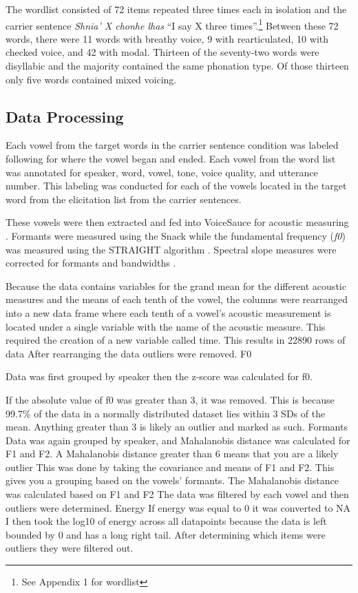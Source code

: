 \documentclass[12pt, letterpaper]{article}
\begin{document}
The wordlist consisted of 72 items repeated three times each in isolation and the carrier sentence \textit{Shnia' X chonhe lhas} ``I say X three times''.\footnote{See Appendix 1 for wordlist} Between these 72 words, there were 11 words with breathy voice, 9 with rearticulated, 10 with checked voice, and 42 with modal. Thirteen of the seventy-two words were disyllabic and the majority contained the same phonation type. Of those thirteen only five words contained mixed voicing.

\subsection{Data Processing} \label{sec:Processing}

Each vowel from the target words in the carrier sentence condition was labeled following \citet{garellekAcousticDiscriminabilityComplex2020} for where the vowel began and ended. Each vowel from the word list was annotated for speaker, word, vowel, tone, voice quality, and utterance number. This labeling was conducted for each of the vowels located in the target word from the elicitation list from the carrier sentences.

These vowels were then extracted and fed into VoiceSauce for acoustic measuring \citep{shueVOICESAUCEProgramVoice2009}. Formants were measured using the Snack \citep{sjolanderSnackSoundToolkit2004} while the fundamental frequency (\textit{f0}) was measured using the STRAIGHT algorithm \citep{kawaharaInstantaneousfrequencybasedPitchExtraction1998}. Spectral slope measures were corrected for formants and bandwidths \citep{hansonGlottalCharacteristicsFemale1997,iseliAgeSexVowel2007}.

Because the data contains variables for the grand mean for the different acoustic measures and the means of each tenth of the vowel, the columns were rearranged into a new data frame where each tenth of a vowel’s acoustic measurement is located under a single variable with the name of the acoustic measure. 
This required the creation of a new variable called time. 
This results in 22890 rows of data
After rearranging the data outliers were removed. 
F0

Data was first grouped by speaker then the z-score was calculated for f0. 

If the absolute value of f0 was greater than 3, it was removed. This is because 99.7\% of the data in a normally distributed dataset lies within 3 SDs of the mean. Anything greater than 3 is likely an outlier and marked as such.
Formants
Data was again grouped by speaker, and Mahalanobis distance was calculated for F1 and F2. 
A Mahalanobis distance greater than 6 means that you are a likely outlier
This was done by taking the covariance and means of F1 and F2. This gives you a grouping based on the vowels’ formants. 
The Mahalanobis distance was calculated based on F1 and F2
The data was filtered by each vowel and then outliers were determined. 
Energy
If energy was equal to 0 it was converted to NA
I then took the log10  of energy across all datapoints because the data is left bounded by 0 and has a long right tail. 
After determining which items were outliers they were filtered out.
\end{document}
